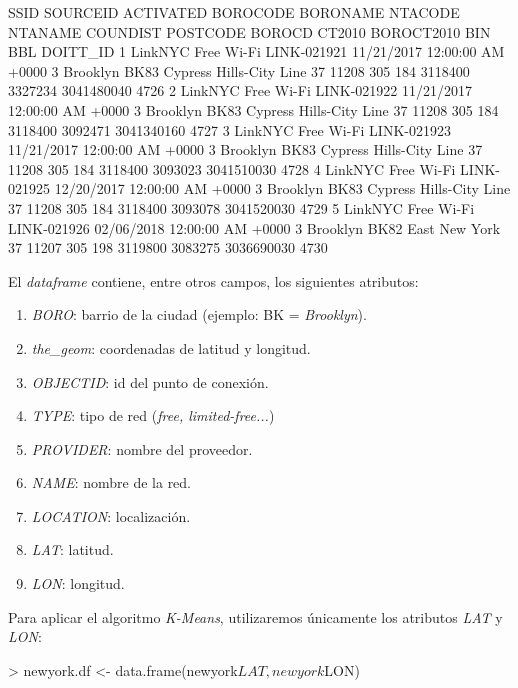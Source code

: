 \documentclass [a4paper] {article}
\begin{document}
\begin{footnotesize}
\begin{Schunk}
\begin{Soutput}
                SSID    SOURCEID                    ACTIVATED BOROCODE BORONAME NTACODE                 NTANAME COUNDIST POSTCODE BOROCD CT2010 BOROCT2010     BIN        BBL DOITT_ID
1 LinkNYC Free Wi-Fi LINK-021921 11/21/2017 12:00:00 AM +0000        3 Brooklyn    BK83 Cypress Hills-City Line       37    11208    305    184    3118400 3327234 3041480040     4726
2 LinkNYC Free Wi-Fi LINK-021922 11/21/2017 12:00:00 AM +0000        3 Brooklyn    BK83 Cypress Hills-City Line       37    11208    305    184    3118400 3092471 3041340160     4727
3 LinkNYC Free Wi-Fi LINK-021923 11/21/2017 12:00:00 AM +0000        3 Brooklyn    BK83 Cypress Hills-City Line       37    11208    305    184    3118400 3093023 3041510030     4728
4 LinkNYC Free Wi-Fi LINK-021925 12/20/2017 12:00:00 AM +0000        3 Brooklyn    BK83 Cypress Hills-City Line       37    11208    305    184    3118400 3093078 3041520030     4729
5 LinkNYC Free Wi-Fi LINK-021926 02/06/2018 12:00:00 AM +0000        3 Brooklyn    BK82           East New York       37    11207    305    198    3119800 3083275 3036690030     4730
\end{Soutput}
\end{Schunk}
\end{footnotesize}

El \textit{dataframe} contiene, entre otros campos, los siguientes atributos:
\begin{enumerate}
  \item \textit{BORO}: barrio de la ciudad (ejemplo: BK = \textit{Brooklyn}).
  \item \textit{the\_geom}: coordenadas de latitud y longitud.
  \item \textit{OBJECTID}: id del punto de conexión.
  \item \textit{TYPE}: tipo de red (\textit{free, limited-free...})
  \item \textit{PROVIDER}: nombre del proveedor.
  \item \textit{NAME}: nombre de la red.
  \item \textit{LOCATION}: localización.
  \item \textit{LAT}: latitud.
  \item \textit{LON}: longitud.
\end{enumerate}

Para aplicar el algoritmo \textit{K-Means}, utilizaremos únicamente los atributos \textit{LAT} y \textit{LON}:
\begin{Schunk}
\begin{Sinput}
> newyork.df <- data.frame(newyork$LAT, newyork$LON)
\end{Sinput}
\end{Schunk}
\end{document}
